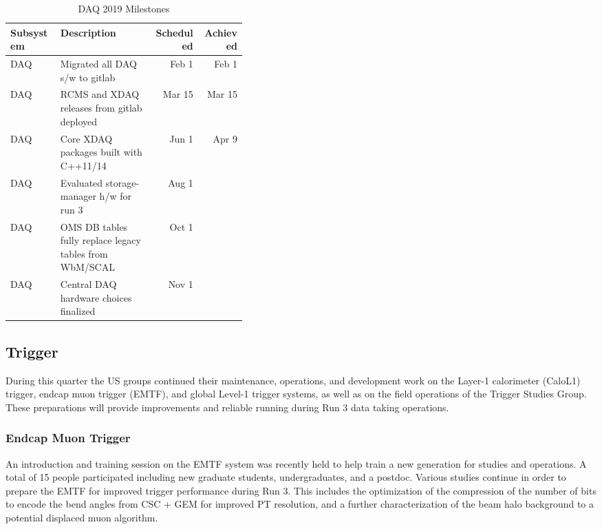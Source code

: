 \documentclass[12pt]{article}
\begin{document}
\begin{table}[htp]
\caption{DAQ 2019 Milestones}
\begin{center}
\begin{tabular}{|l|p{0.4\linewidth}|r|r|}
\hline
Subsystem&Description&Scheduled&Achieved\\
\hline
DAQ &Migrated all DAQ s/w to gitlab	&Feb 1 &Feb 1 \\
\hline
DAQ &RCMS and XDAQ releases from gitlab deployed &Mar 15 &Mar 15  \\
\hline
DAQ &Core XDAQ packages built with C++11/14 &Jun 1 &Apr 9 \\
\hline
DAQ &Evaluated storage-manager h/w for run 3 &Aug 1 & \\
\hline
DAQ &OMS DB tables fully replace legacy tables from WbM/SCAL &Oct 1 & \\
\hline
DAQ &Central DAQ hardware choices finalized &Nov 1 & \\
\hline
\end{tabular}
\end{center}
\label{DAQ2019Milestones}
\end{table}%

\subsection{Trigger}


During this quarter the US groups continued their maintenance,
operations, and development work on the Layer-1
calorimeter (CaloL1) trigger, endcap muon trigger (EMTF), and global
Level-1 trigger systems, as well as
on the field operations of the Trigger Studies Group. These
preparations will
provide improvements and reliable running during Run 3 data taking
operations.

\subsubsection{Endcap Muon Trigger}


An introduction and training session on the EMTF system was recently
held to help train a new generation for studies and operations. A
total of  15 people participated including new graduate students,
undergraduates, and a postdoc.  Various studies continue in order to
prepare the EMTF for improved trigger performance 
during Run 3. This includes the
optimization of the compression of the number of bits to encode the
bend angles from CSC + GEM for improved PT resolution, and a 
further characterization of the beam halo background to a potential
displaced muon algorithm.
\end{document}
